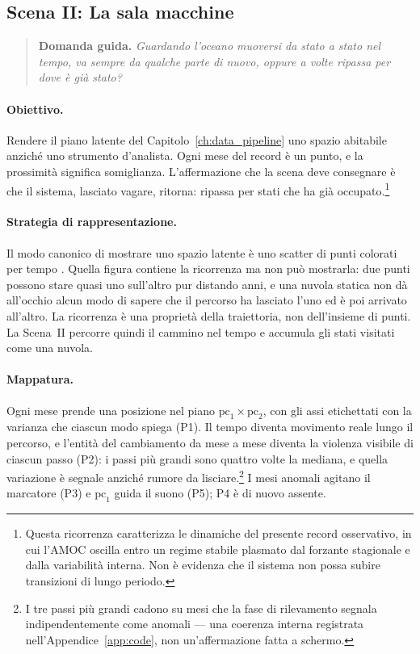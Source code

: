 \subsection{Scena II: La sala macchine}
\label{subsec:scene-engine}

\begin{quote}
\textbf{Domanda guida.} \emph{Guardando l'oceano muoversi da stato a stato nel tempo, va sempre da qualche parte di nuovo, oppure a volte ripassa per dove è già stato?}
\end{quote}



\paragraph{Obiettivo.} Rendere il piano latente del Capitolo~\ref{ch:data_pipeline} uno spazio abitabile anziché uno strumento d'analista. Ogni mese del record è un punto, e la prossimità significa somiglianza. L'affermazione che la scena deve consegnare è che il sistema, lasciato vagare, ritorna: ripassa per stati che ha già occupato.\footnote{Questa ricorrenza caratterizza le dinamiche del presente record osservativo, in cui l'AMOC oscilla entro un regime stabile plasmato dal forzante stagionale e dalla variabilità interna. Non è evidenza che il sistema non possa subire transizioni di lungo periodo.}

\paragraph{Strategia di rappresentazione.} Il modo canonico di mostrare uno spazio latente è uno scatter di punti colorati per tempo \parencite{sacha2018}. Quella figura contiene la ricorrenza ma non può mostrarla: due punti possono stare quasi uno sull'altro pur distando anni, e una nuvola statica non dà all'occhio alcun modo di sapere che il percorso ha lasciato l'uno ed è poi arrivato all'altro. La ricorrenza è una proprietà della traiettoria, non dell'insieme di punti. La Scena~II percorre quindi il cammino nel tempo e accumula gli stati visitati come una nuvola.

\paragraph{Mappatura.} Ogni mese prende una posizione nel piano $\mathrm{pc}_1 \times \mathrm{pc}_2$, con gli assi etichettati con la varianza che ciascun modo spiega (P1). Il tempo diventa movimento reale lungo il percorso, e l'entità del cambiamento da mese a mese diventa la violenza visibile di ciascun passo (P2): i passi più grandi sono quattro volte la mediana, e quella variazione è segnale anziché rumore da lisciare.\footnote{I tre passi più grandi cadono su mesi che la fase di rilevamento segnala indipendentemente come anomali --- una coerenza interna registrata nell'Appendice~\ref{app:code}, non un'affermazione fatta a schermo.} I mesi anomali agitano il marcatore (P3) e $\mathrm{pc}_1$ guida il suono (P5); P4 è di nuovo assente.

